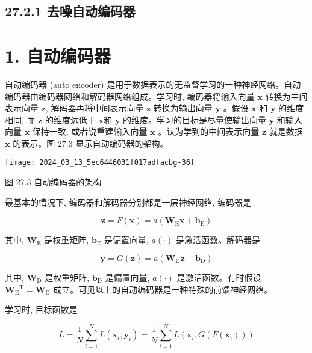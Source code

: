 \documentclass[10pt]{article}
\begin{document}
\subsection*{27.2.1 去噪自动编码器}
\section*{1. 自动编码器}
自动编码器 (auto encoder) 是用于数据表示的无监督学习的一种神经网络。自动编码器由编码器网络和解码器网络组成。学习时, 编码器将输入向量 $\boldsymbol{x}$ 转换为中间表示向量 $\boldsymbol{z}$, 解码器再将中间表示向量 $\boldsymbol{z}$ 转换为输出向量 $\boldsymbol{y}$ 。假设 $\boldsymbol{x}$ 和 $\boldsymbol{y}$ 的维度相同, 而 $\boldsymbol{z}$ 的维度远低于 $\boldsymbol{x}$和 $\boldsymbol{y}$ 的维度。学习的目标是尽量使输出向量 $\boldsymbol{y}$ 和输入向量 $\boldsymbol{x}$ 保持一致, 或者说重建输入向量 $\boldsymbol{x}$ 。认为学到的中间表示向量 $\boldsymbol{z}$ 就是数据 $\boldsymbol{x}$ 的表示。图 27.3 显示自动编码器的架构。

\begin{center}
\texttt{[image: 2024\_03\_13\_5ec6446031f017adfacbg-36]}
\end{center}

图 27.3 自动编码器的架构

最基本的情况下, 编码器和解码器分别都是一层神经网络, 编码器是


\begin{equation*}
\boldsymbol{z}=F(\boldsymbol{x})=a\left(\boldsymbol{W}_{\mathrm{E}} \boldsymbol{x}+\boldsymbol{b}_{\mathrm{E}}\right) \tag{27.13}
\end{equation*}


其中, $\boldsymbol{W}_{\mathrm{E}}$ 是权重矩阵, $\boldsymbol{b}_{\mathrm{E}}$ 是偏置向量, $a(\cdot)$ 是激活函数。解码器是


\begin{equation*}
\boldsymbol{y}=G(\boldsymbol{z})=a\left(\boldsymbol{W}_{\mathrm{D}} \boldsymbol{z}+\boldsymbol{b}_{\mathrm{D}}\right) \tag{27.14}
\end{equation*}


其中, $\boldsymbol{W}_{\mathrm{D}}$ 是权重矩阵, $\boldsymbol{b}_{\mathrm{D}}$ 是偏置向量, $a(\cdot)$ 是激活函数。有时假设 $\boldsymbol{W}_{\mathrm{E}}{ }^{\mathrm{T}}=\boldsymbol{W}_{\mathrm{D}}$ 成立。可见以上的自动编码器是一种特殊的前馈神经网络。

学习时, 目标函数是


\begin{equation*}
L=\frac{1}{N} \sum_{i=1}^{N} L\left(\boldsymbol{x}_{i}, \boldsymbol{y}_{i}\right)=\frac{1}{N} \sum_{i=1}^{N} L\left(\boldsymbol{x}_{i}, G\left(F\left(\boldsymbol{x}_{i}\right)\right)\right) \tag{27.15}
\end{equation*}
\end{document}
